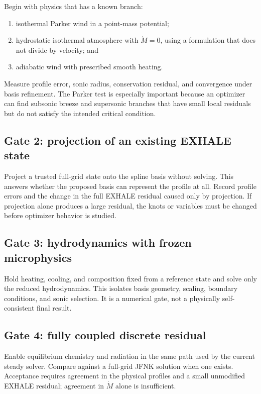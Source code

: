 \documentclass[english,a4paper]{my_memo}
\newcommand{\mdot}{\dot M}
\begin{document}
Begin with physics that has a known branch:
\begin{enumerate}
\item isothermal Parker wind in a point-mass potential;
\item hydrostatic isothermal atmosphere with \(\mdot=0\), using a formulation
  that does not divide by velocity; and
\item adiabatic wind with prescribed smooth heating.
\end{enumerate}
Measure profile error, sonic radius, conservation residual, and convergence
under basis refinement.  The Parker test is especially important because an
optimizer can find subsonic breeze and supersonic branches that have small local
residuals but do not satisfy the intended critical condition.

\subsection{Gate 2: projection of an existing EXHALE state}

Project a trusted full-grid state onto the spline basis without solving.  This
answers whether the proposed basis can represent the profile at all.  Record
profile errors and the change in the full EXHALE residual caused only by
projection.  If projection alone produces a large residual, the knots or
variables must be changed before optimizer behavior is studied.

\subsection{Gate 3: hydrodynamics with frozen microphysics}

Hold heating, cooling, and composition fixed from a reference state and solve
only the reduced hydrodynamics.  This isolates basis geometry, scaling, boundary
conditions, and sonic selection.  It is a numerical gate, not a physically
self-consistent final result.

\subsection{Gate 4: fully coupled discrete residual}

Enable equilibrium chemistry and radiation in the same path used by the current
steady solver.  Compare against a full-grid JFNK solution when one exists.
Acceptance requires agreement in the physical profiles and a small unmodified
EXHALE residual; agreement in \(\mdot\) alone is insufficient.
\end{document}
